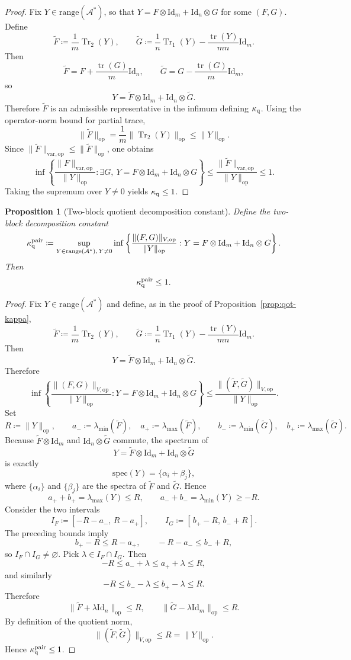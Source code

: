 \documentclass[11pt]{article}
\newcommand{\Id}{\mathrm{Id}}
\newcommand{\tr}{\operatorname{tr}}
\newcommand{\Trone}{\operatorname{Tr}_{1}}
\newcommand{\Trtwo}{\operatorname{Tr}_{2}}
\newcommand{\eqdef}{\coloneqq}
\newcommand{\Aa}{\mathcal{A}}
\newcommand{\op}{\mathrm{op}}
\newcommand{\varop}{\mathrm{var},\op}
\theoremstyle{plain}
\newtheorem{proposition}{Proposition}[section]
\begin{document}
\begin{proof}
Fix $Y \in \mathrm{range}(\Aa^\ast)$, so that $Y=F \otimes \Id_m+\Id_n \otimes G$ for some $(F,G)$.
Define
\[
\widetilde F \eqdef \frac{1}{m}\Trtwo(Y),
\qquad
\widetilde G \eqdef \frac{1}{n}\Trone(Y)-\frac{\tr(Y)}{mn}\Id_m.
\]
Then
\[
\widetilde F = F+\frac{\tr(G)}{m}\Id_n,
\qquad
\widetilde G = G-\frac{\tr(G)}{m}\Id_m,
\]
so
\[
Y=\widetilde F \otimes \Id_m + \Id_n \otimes \widetilde G.
\]
Therefore $\widetilde F$ is an admissible representative in the infimum defining $\kappa_{\rm q}$.
Using the operator-norm bound for partial trace,
\[
\|\widetilde F\|_{\op}
=
\frac1m \|\Trtwo(Y)\|_{\op}
\le
\|Y\|_{\op}.
\]
Since $\|\widetilde F\|_{\varop}\le \|\widetilde F\|_{\op}$, one obtains
\[
\inf\left\{
\frac{\|F\|_{\varop}}{\|Y\|_{\op}}
:
\exists G,\ Y=F \otimes \Id_m+\Id_n \otimes G
\right\}
\le
\frac{\|\widetilde F\|_{\varop}}{\|Y\|_{\op}}
\le 1.
\]
Taking the supremum over $Y\neq 0$ yields $\kappa_{\rm q}\le 1$.
\end{proof}

\begin{proposition}[Two-block quotient decomposition constant]
\label{prop:qot-kappa-pair}
Define the two-block decomposition constant
\[
\kappa_{\rm q}^{\rm pair}
\eqdef
\sup_{Y \in \mathrm{range}(\Aa^\ast),\,Y\neq 0}
\inf\left\{
\frac{\|(F,G)\|_{V,\op}}{\|Y\|_{\op}}
:
Y=F \otimes \Id_m+\Id_n \otimes G
\right\}.
\]
Then
\[
\kappa_{\rm q}^{\rm pair}\le 1.
\]
\end{proposition}

\begin{proof}
Fix $Y\in \mathrm{range}(\Aa^\ast)$ and define, as in the proof of Proposition~\ref{prop:qot-kappa},
\[
\widetilde F \eqdef \frac{1}{m}\Trtwo(Y),
\qquad
\widetilde G \eqdef \frac{1}{n}\Trone(Y)-\frac{\tr(Y)}{mn}\Id_m.
\]
Then
\[
Y=\widetilde F \otimes \Id_m+\Id_n \otimes \widetilde G.
\]
Therefore
\[
\inf\left\{
\frac{\|(F,G)\|_{V,\op}}{\|Y\|_{\op}}
:
Y=F \otimes \Id_m+\Id_n \otimes G
\right\}
\le
\frac{\|(\widetilde F,\widetilde G)\|_{V,\op}}{\|Y\|_{\op}}.
\]
Set
\[
R\eqdef \|Y\|_{\op},
\qquad
a_- \eqdef \lambda_{\min}(\widetilde F),\quad a_+ \eqdef \lambda_{\max}(\widetilde F),
\qquad
b_- \eqdef \lambda_{\min}(\widetilde G),\quad b_+ \eqdef \lambda_{\max}(\widetilde G).
\]
Because $\widetilde F\otimes \Id_m$ and $\Id_n\otimes \widetilde G$ commute, the spectrum of
\[
Y=\widetilde F \otimes \Id_m+\Id_n \otimes \widetilde G
\]
is exactly
\[
\mathrm{spec}(Y)=\{\alpha_i+\beta_j\},
\]
where $\{\alpha_i\}$ and $\{\beta_j\}$ are the spectra of $\widetilde F$ and $\widetilde G$.
Hence
\[
a_+ + b_+ = \lambda_{\max}(Y)\le R,
\qquad
a_- + b_- = \lambda_{\min}(Y)\ge -R.
\]
Consider the two intervals
\[
I_F \eqdef [-R-a_-,\,R-a_+],
\qquad
I_G \eqdef [\,b_+-R,\,b_-+R\,].
\]
The preceding bounds imply
\[
b_+-R\le R-a_+,
\qquad
-R-a_-\le b_-+R,
\]
so $I_F\cap I_G\neq \varnothing$.
Pick $\lambda \in I_F\cap I_G$.
Then
\[
-R\le a_-+\lambda \le a_++\lambda \le R,
\]
and similarly
\[
-R\le b_--\lambda \le b_+-\lambda \le R.
\]
Therefore
\[
\|\widetilde F+\lambda \Id_n\|_{\op}\le R,
\qquad
\|\widetilde G-\lambda \Id_m\|_{\op}\le R.
\]
By definition of the quotient norm,
\[
\|(\widetilde F,\widetilde G)\|_{V,\op}\le R=\|Y\|_{\op}.
\]
Hence $\kappa_{\rm q}^{\rm pair}\le 1$.
\end{proof}
\end{document}
